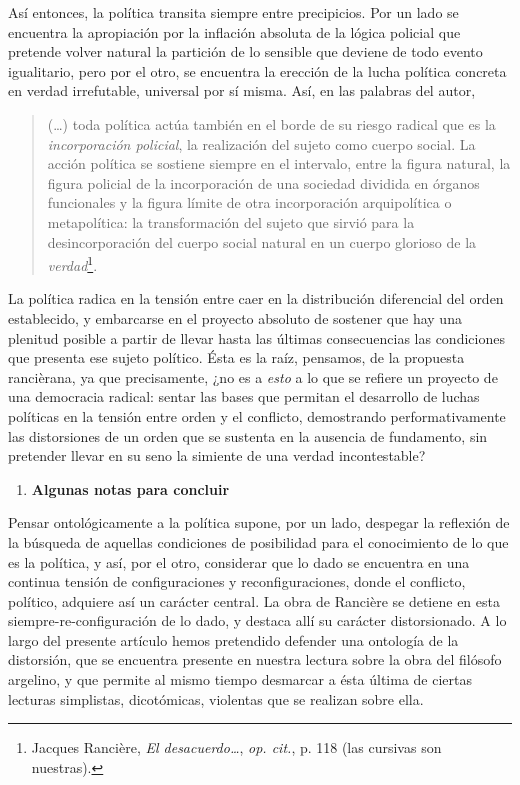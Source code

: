 \documentclass{book}
\begin{document}
Así entonces, la política transita siempre entre precipicios. Por un
lado se encuentra la apropiación por la inflación absoluta de la lógica
policial que pretende volver natural la partición de lo sensible que
deviene de todo evento igualitario, pero por el otro, se encuentra la
erección de la lucha política concreta en verdad irrefutable, universal
por sí misma. Así, en las palabras del autor,

\begin{quote}
(\dots) toda política actúa también en el borde de su riesgo
radical que es la \emph{incorporación policial}, la realización del
sujeto como cuerpo social. La acción política se sostiene siempre en el
intervalo, entre la figura natural, la figura policial de la
incorporación de una sociedad dividida en órganos funcionales y la
figura límite de otra incorporación arquipolítica o metapolítica: la
transformación del sujeto que sirvió para la desincorporación del cuerpo
social natural en un cuerpo glorioso de la \emph{verdad}\footnote{Jacques
  Rancière, \emph{El desacuerdo\ldots{}}, \emph{op. cit.}, p. 118 (las
  cursivas son nuestras).}.
\end{quote}

La política radica en la tensión entre caer en la distribución
diferencial del orden establecido, y embarcarse en el proyecto absoluto
de sostener que hay una plenitud posible a partir de llevar hasta las
últimas consecuencias las condiciones que presenta ese sujeto político.
Ésta es la raíz, pensamos, de la propuesta rancièrana, ya que
precisamente, ¿no es a \emph{esto} a lo que se refiere un proyecto de
una democracia radical: sentar las bases que permitan el desarrollo de
luchas políticas en la tensión entre orden y el conflicto, demostrando
performativamente las distorsiones de un orden que se sustenta en la
ausencia de fundamento, sin pretender llevar en su seno la simiente de
una verdad incontestable?

\begin{enumerate}
\def\labelenumi{\arabic{enumi}.}
\setcounter{enumi}{6}
\item
  \textbf{Algunas notas para concluir}
\end{enumerate}

Pensar ontológicamente a la política supone, por un lado, despegar la
reflexión de la búsqueda de aquellas condiciones de posibilidad para el
conocimiento de lo que es la política, y así, por el otro, considerar
que lo dado se encuentra en una continua tensión de configuraciones y
reconfiguraciones, donde el conflicto, político, adquiere así un
carácter central. La obra de Rancière se detiene en esta
siempre-re-configuración de lo dado, y destaca allí su carácter
distorsionado. A lo largo del presente artículo hemos pretendido
defender una ontología de la distorsión, que se encuentra presente en
nuestra lectura sobre la obra del filósofo argelino, y que permite al
mismo tiempo desmarcar a ésta última de ciertas lecturas simplistas,
dicotómicas, violentas que se realizan sobre ella.
\end{document}
